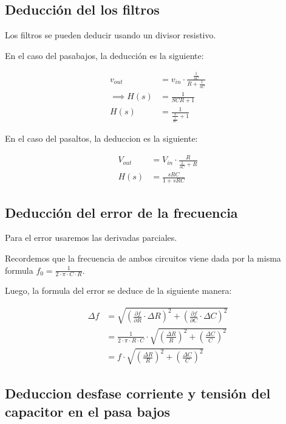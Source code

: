 \documentclass{article}
\begin{document}
\subsection{Deducción del los filtros}
\label{subsec:decuccion filtros}
Los filtros se pueden deducir usando un divisor resistivo. \par

En el caso del pasabajos, la deducción es la siguiente:

\begin{align*}
    v_{out} &= v_{in} \cdot \frac{\frac{1}{sC}}{R+ \frac{1}{sC}} \\
    \implies H(s) &= \frac{1}{SCR+1} \\
    H(s)&= \frac{1}{\frac{s}{\frac{1}{RC}} +1} 
\end{align*}

En el caso del pasaltos, la deduccion es la siguiente:

\begin{align*}
    V_{out} &= V_{in} \cdot \frac{R}{\frac{1}{sC}+R}\\
    H(s) &= \frac{sRC}{1+sRC}
\end{align*}

\subsection{Deducción del error de la frecuencia}
\label{subsec: Deducción del error de la frecuencia}
Para el error usaremos las derivadas parciales. \par

Recordemos que la frecuencia de ambos circuitos viene dada por la misma formula $f_0 = \frac{1}{2\cdot \pi \cdot C \cdot R} $. \par

Luego, la formula del error se deduce de la siguiente manera:

\begin{align*}
    \Delta f&= \sqrt{(\frac{\partial f }{\partial R} \cdot \Delta R)^{2} + (\frac{\partial f }{\partial C} \cdot \Delta C)^{2}}\\
    &= \frac{1}{2\cdot \pi \cdot R \cdot C} \cdot \sqrt{(\frac{\Delta R}{R})^2 + (\frac{\Delta C}{C})^2}\\
    & = f \cdot \sqrt{(\frac{\Delta R}{R})^2 + (\frac{\Delta C}{C})^2}
\end{align*}

\subsection{Deduccion desfase corriente y tensión del capacitor en el pasa bajos}
\label{subsec:desfase}
\end{document}
